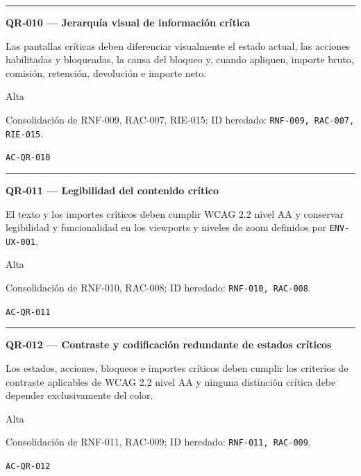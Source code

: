 \documentclass[10pt,letterpaper]{article}
\begin{document}
\vspace{0.25em}\hrule\vspace{0.65em}
\noindent\textbf{QR-010 --- Jerarquía visual de información crítica}\par
\begin{description}[style=nextline,leftmargin=3.15cm,labelwidth=2.8cm,font=\normalfont\bfseries]
\item[Obligación] Las pantallas críticas deben diferenciar visualmente el estado actual, las acciones habilitadas y bloqueadas, la causa del bloqueo y, cuando apliquen, importe bruto, comisión, retención, devolución e importe neto.
\item[Prioridad] Alta
\item[Procedencia] Consolidación de RNF-009, RAC-007, RIE-015; ID heredado: \texttt{RNF-009, RAC-007, RIE-015}.
\item[Verificación] \texttt{AC-QR-010}
\end{description}
\vspace{0.25em}\hrule\vspace{0.65em}
\noindent\textbf{QR-011 --- Legibilidad del contenido crítico}\par
\begin{description}[style=nextline,leftmargin=3.15cm,labelwidth=2.8cm,font=\normalfont\bfseries]
\item[Obligación] El texto y los importes críticos deben cumplir WCAG 2.2 nivel AA y conservar legibilidad y funcionalidad en los viewports y niveles de zoom definidos por \texttt{ENV-UX-001}.
\item[Prioridad] Alta
\item[Procedencia] Consolidación de RNF-010, RAC-008; ID heredado: \texttt{RNF-010, RAC-008}.
\item[Verificación] \texttt{AC-QR-011}
\end{description}
\vspace{0.25em}\hrule\vspace{0.65em}
\noindent\textbf{QR-012 --- Contraste y codificación redundante de estados críticos}\par
\begin{description}[style=nextline,leftmargin=3.15cm,labelwidth=2.8cm,font=\normalfont\bfseries]
\item[Obligación] Los estados, acciones, bloqueos e importes críticos deben cumplir los criterios de contraste aplicables de WCAG 2.2 nivel AA y ninguna distinción crítica debe depender exclusivamente del color.
\item[Prioridad] Alta
\item[Procedencia] Consolidación de RNF-011, RAC-009; ID heredado: \texttt{RNF-011, RAC-009}.
\item[Verificación] \texttt{AC-QR-012}
\end{description}
\end{document}
